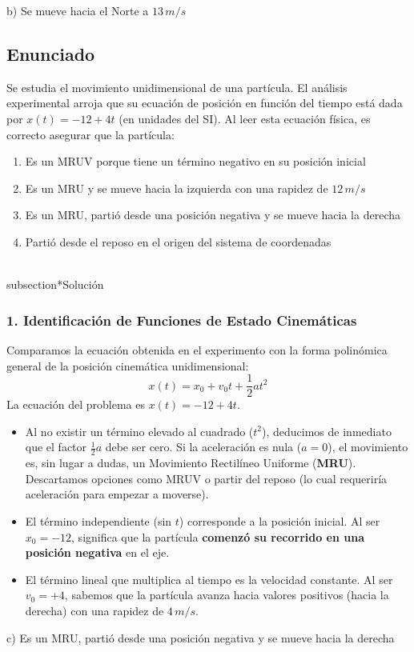 \documentclass[12pt, a4paper]{article}
\begin{document}
\begin{tcolorbox}[colback=green!5!white, colframe=green!50!black, title=Respuesta Final]
\centering \Large b) Se mueve hacia el Norte a $13\,\si{m/s}$
\end{tcolorbox}

\newpage

\subsection*{Enunciado}
Se estudia el movimiento unidimensional de una partícula. El análisis experimental arroja que su ecuación de posición en función del tiempo está dada por $x(t) = -12 + 4t$ (en unidades del SI). Al leer esta ecuación física, es correcto asegurar que la partícula:
\begin{enumerate}[label=\alph*)]
    \item Es un MRUV porque tiene un término negativo en su posición inicial
    \item Es un MRU y se mueve hacia la izquierda con una rapidez de $12\,\si{m/s}$
    \item Es un MRU, partió desde una posición negativa y se mueve hacia la derecha
    \item Partió desde el reposo en el origen del sistema de coordenadas
\end{enumerate}

\\subsection*{Solución}

\subsubsection*{1. Identificación de Funciones de Estado Cinemáticas}
Comparamos la ecuación obtenida en el experimento con la forma polinómica general de la posición cinemática unidimensional:
$$ x(t) = x_0 + v_0 t + \frac{1}{2} a t^2 $$
La ecuación del problema es $x(t) = -12 + 4t$.
\begin{itemize}
    \item Al no existir un término elevado al cuadrado ($t^2$), deducimos de inmediato que el factor $\frac{1}{2}a$ debe ser cero. Si la aceleración es nula ($a = 0$), el movimiento es, sin lugar a dudas, un Movimiento Rectilíneo Uniforme (\textbf{MRU}). Descartamos opciones como MRUV o partir del reposo (lo cual requeriría aceleración para empezar a moverse).
    \item El término independiente (sin $t$) corresponde a la posición inicial. Al ser $x_0 = -12$, significa que la partícula \textbf{comenzó su recorrido en una posición negativa} en el eje.
    \item El término lineal que multiplica al tiempo es la velocidad constante. Al ser $v_0 = +4$, sabemos que la partícula avanza hacia valores positivos (hacia la derecha) con una rapidez de $4\,\si{m/s}$.
\end{itemize}

\begin{tcolorbox}[colback=green!5!white, colframe=green!50!black, title=Respuesta Final]
\centering \Large c) Es un MRU, partió desde una posición negativa y se mueve hacia la derecha
\end{tcolorbox}
\end{document}
